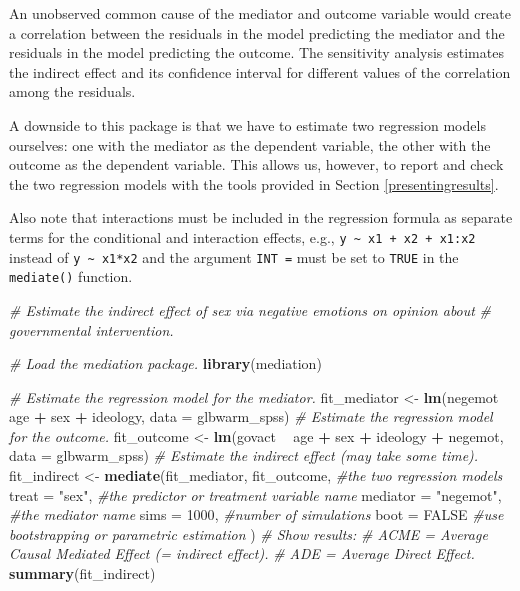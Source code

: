 \documentclass[doc,floatsintext]{apa6}
\newenvironment{Shaded}{\begin{snugshade}}{\end{snugshade}}
\newcommand{\KeywordTok}[1]{\textcolor[rgb]{0.13,0.29,0.53}{\textbf{#1}}}
\newcommand{\DataTypeTok}[1]{\textcolor[rgb]{0.13,0.29,0.53}{#1}}
\newcommand{\DecValTok}[1]{\textcolor[rgb]{0.00,0.00,0.81}{#1}}
\newcommand{\StringTok}[1]{\textcolor[rgb]{0.31,0.60,0.02}{#1}}
\newcommand{\CommentTok}[1]{\textcolor[rgb]{0.56,0.35,0.01}{\textit{#1}}}
\newcommand{\OtherTok}[1]{\textcolor[rgb]{0.56,0.35,0.01}{#1}}
\newcommand{\OperatorTok}[1]{\textcolor[rgb]{0.81,0.36,0.00}{\textbf{#1}}}
\newcommand{\NormalTok}[1]{#1}
\begin{document}
An unobserved common cause of the mediator and outcome variable would
create a correlation between the residuals in the model predicting the
mediator and the residuals in the model predicting the outcome. The
sensitivity analysis estimates the indirect effect and its confidence
interval for different values of the correlation among the residuals.

A downside to this package is that we have to estimate two regression
models ourselves: one with the mediator as the dependent variable, the
other with the outcome as the dependent variable. This allows us,
however, to report and check the two regression models with the tools
provided in Section \ref{presentingresults}.

Also note that interactions must be included in the regression formula
as separate terms for the conditional and interaction effects, e.g.,
\texttt{y\ \textasciitilde{}\ x1\ +\ x2\ +\ x1:x2} instead of
\texttt{y\ \textasciitilde{}\ x1*x2} and the argument \texttt{INT\ =}
must be set to \texttt{TRUE} in the \texttt{mediate()} function.

\begin{Shaded}
\begin{Highlighting}[]
\CommentTok{# Estimate the indirect effect of sex via negative emotions on opinion about}
\CommentTok{# governmental intervention.}

\CommentTok{# Load the mediation package.}
\KeywordTok{library}\NormalTok{(mediation)}

\CommentTok{# Estimate the regression model for the mediator.}
\NormalTok{fit_mediator <-}\StringTok{ }\KeywordTok{lm}\NormalTok{(negemot }\OperatorTok{~}\StringTok{ }\NormalTok{age }\OperatorTok{+}\StringTok{ }\NormalTok{sex }\OperatorTok{+}\StringTok{ }\NormalTok{ideology, }\DataTypeTok{data =}\NormalTok{ glbwarm_spss) }
\CommentTok{# Estimate the regression model for the outcome.}
\NormalTok{fit_outcome <-}\StringTok{ }\KeywordTok{lm}\NormalTok{(govact }\OperatorTok{~}\StringTok{ }\NormalTok{age }\OperatorTok{+}\StringTok{ }\NormalTok{sex }\OperatorTok{+}\StringTok{ }\NormalTok{ideology }\OperatorTok{+}\StringTok{ }\NormalTok{negemot, }\DataTypeTok{data =}\NormalTok{ glbwarm_spss) }
\CommentTok{# Estimate the indirect effect (may take some time).}
\NormalTok{fit_indirect <-}\StringTok{ }\KeywordTok{mediate}\NormalTok{(fit_mediator, fit_outcome, }\CommentTok{#the two regression models}
                        \DataTypeTok{treat =} \StringTok{"sex"}\NormalTok{, }\CommentTok{#the predictor or treatment variable name}
                        \DataTypeTok{mediator =} \StringTok{"negemot"}\NormalTok{, }\CommentTok{#the mediator name}
                        \DataTypeTok{sims =} \DecValTok{1000}\NormalTok{, }\CommentTok{#number of simulations}
                        \DataTypeTok{boot =} \OtherTok{FALSE} \CommentTok{#use bootstrapping or parametric estimation}
\NormalTok{                        )}
\CommentTok{# Show results:}
\CommentTok{# ACME = Average Causal Mediated Effect (= indirect effect).}
\CommentTok{# ADE = Average Direct Effect.}
\KeywordTok{summary}\NormalTok{(fit_indirect)}
\end{Highlighting}
\end{Shaded}
\end{document}
